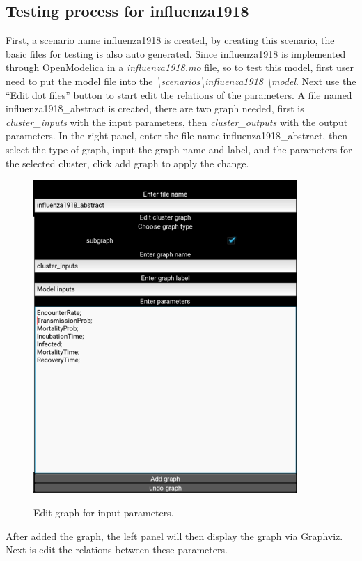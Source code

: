 \subsection{Testing process for influenza1918}
First, a scenario name influenza1918 is created, by creating this scenario, the basic files for testing is also auto generated. Since influenza1918 is implemented through OpenModelica in a \textsl{influenza1918.mo} file, so to test this model, first user need to put the model file into the \textsl{\textbackslash scenarios\textbackslash influenza1918 \textbackslash model}. Next use the “Edit dot files” button to start edit the relations of the parameters. A file named influenza1918\_abstract is created, there are two graph needed, first is \textsl{cluster\_inputs} with the input parameters, then \textsl{cluster\_outputs} with the output parameters. In the right panel, enter the file name influenza1918\_abstract, then select the type of graph, input the graph name and label, and the parameters for the selected cluster, click add graph to apply the change.
\begin{figure}[H]
	\centering
	\includegraphics[width=10cm]{figures/influenzaTestProcess3.png}\\
	\caption{Edit graph for input parameters.}
	\label{fig:figure21}
\end{figure}
After added the graph, the left panel will then display the graph via Graphviz. Next is edit the relations between these parameters.
